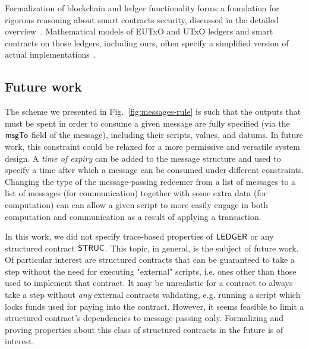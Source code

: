 Formalization of blockchain and ledger functionality forms a foundation for
rigorous reasoning about smart contracts security, discussed in the
detailed overview~\cite{leveragingfm}. Mathematical models of
EUTxO and UTxO ledgers and smart contracts on those ledgers, including ours,
often specify a simplified version of actual
implementations~\cite{eutxo,eutxoma,blockalg,nester,algorandformal,bitcoinformal}.


\subsection{Future work}
\label{sec:future}

The scheme we presented in Fig.~\ref{fig:messages-rule} is such that
the outputs that must be spent in order to
consume a given message are fully specified
(via the $\mathsf{msgTo}$ field of the message), including their
scripts, values, and datums. In future work, this constraint
could be relaxed for a more permissive and versatile system design.
A \emph{time of expiry} can be added to the message structure and used to specify a time
after which a message can be consumed under different constraints.
Changing the type of the message-passing redeemer from a list of messages
to a list of messages (for communication) together with some extra data (for computation)
can can allow a given script to more easily engage in both computation and communication
as a result of applying a transaction.

In this work, we did not specify trace-based properties of $\mathsf{LEDGER}$
or any structured contract $\mathsf{STRUC}$. This topic, in general, is the subject of future
work. Of particular interest are structured contracts that can be guaranteed
to take a step without the need for executing "external" scripts, i.e. ones other
than those used to implement that contract. It may be unrealistic for a contract to
always take a step without \emph{any} external contracts validating,
e.g. running a script which locks funds used for paying into the contract. However, it
seems feasible to limit a structured contract's dependencies to message-passing only.
Formalizing and proving properties about this class of structured contracts in the future is
of interest.

